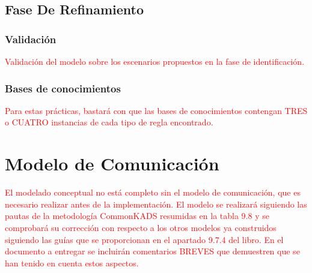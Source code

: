\documentclass[12pt,a4paper,twoside,spanish]{article}      %
\begin{document}
\subsection{Fase De Refinamiento}


\subsubsection{Validación}

\textcolor {red} {Validación del modelo sobre los escenarios propuestos en la fase de identificación.}

\subsubsection{Bases de conocimientos}

\textcolor {red} {Para estas prácticas, bastará con que las bases de conocimientos contengan TRES o CUATRO instancias de cada tipo de regla encontrado.}

\section{Modelo de Comunicación}

\textcolor {red} {El modelado conceptual no está completo sin el modelo de comunicación, que es necesario realizar antes de la implementación. El modelo se realizará siguiendo las pautas de la metodología CommonKADS resumidas en la tabla 9.8 y se comprobará su corrección con respecto a los otros modelos ya construidos siguiendo las guías que se proporcionan en el apartado 9.7.4 del libro. En el documento a entregar se incluirán comentarios BREVES que demuestren que se han tenido en cuenta estos aspectos.}
\end{document}
